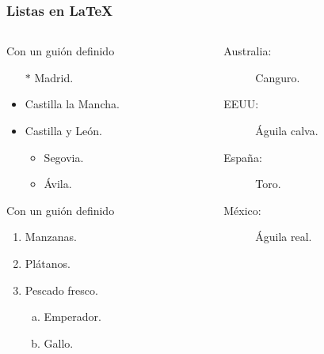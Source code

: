\begin{frame}
    \frametitle{Listas en \LaTeX{}}

    \begin{columns}[onlytextwidth]
        \begin{column}{0.48\textwidth}
            \centering
            \begin{exampleblock}{Con un guión definido} %
                \begin{itemize}
                    \item[$*$] Madrid.
                    \item Castilla la Mancha.
                    \item Castilla y León.
                    \begin{itemize}
                        \item Segovia.
                        \item Ávila.
                    \end{itemize}
                \end{itemize}
            \end{exampleblock}
        \begin{exampleblock}{Con un guión definido} %
            \begin{enumerate}[1.]
                \item Manzanas.
                \item Plátanos.
                \item Pescado fresco.
                \begin{enumerate}[a)]
                    \item Emperador.
                    \item Gallo.
                \end{enumerate}
            \end{enumerate}
        \end{exampleblock}                  
        \end{column}
        
        \begin{column}{0.46\textwidth}
            \begin{exampleblock}{} %
                \begin{description}
                    \item[Australia:] Canguro.
                    \item[EEUU:] Águila calva.
                    \item[España:] Toro.
                    \item[México:] Águila real.
                \end{description}
            \end{exampleblock}
        \end{column}
    \end{columns} 
\end{frame}


